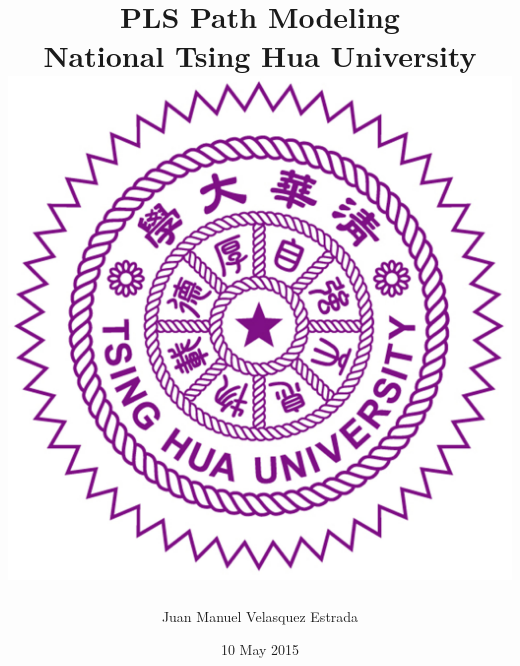 \documentclass[12pt]{report}
\begin{document}
\title{
	{PLS Path Modeling}\\
	{\large National Tsing Hua University}\\
	{\includegraphics{nthu.jpg}}
}
\author{Juan Manuel Velasquez Estrada}
\date{10 May 2015}
\end{document}
